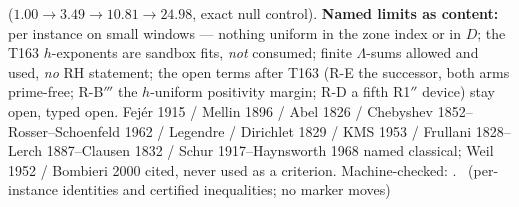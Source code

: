 \documentclass[11pt,a4paper]{article}
\theoremstyle{definition}
\begin{document}
($1.00\to3.49\to10.81\to24.98$, exact null control).
\textbf{Named limits as content:} per instance on small windows ---
nothing uniform in the zone index or in $D$; the T163 $h$-exponents are
sandbox fits, \emph{not} consumed; finite $\Lambda$-sums allowed and
used, \emph{no} RH statement; the open terms after T163 (R-E the
successor, both arms prime-free; R-B$'''$ the $h$-uniform positivity
margin; R-D a fifth R1$''$ device) stay open, typed open.
Fej\'er 1915 / Mellin 1896 / Abel 1826 / Chebyshev 1852--Rosser--Schoenfeld
1962 / Legendre / Dirichlet 1829 / KMS 1953 / Frullani 1828--Lerch
1887--Clausen 1832 / Schur 1917--Haynsworth 1968 named classical; Weil
1952 / Bombieri 2000 cited, never used as a criterion.
Machine-checked:
.
\mE\ (per-instance identities and certified inequalities; no marker moves)
\end{document}
